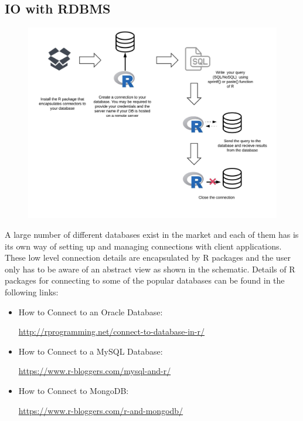 \subsection{IO with RDBMS}
\begin{figure}[ht]
 \centering
    \includegraphics[width = 15 cm]{./viz/ext/IO_R_RDBMS.jpeg}
\end{figure}
\begin{HIGHLIGHT}
A large number of different databases exist in the market and each of them has is its own way of setting up and managing connections with client applications. These low level connection details are encapsulated by R packages and the user only has to be aware of an abstract view as shown in the schematic. Details of R packages for connecting to some of the popular databases can be found in the following links:
\begin{itemize}
  \item How to Connect to an Oracle Database:
  
  \textcolor{cyan}{\url {http://rprogramming.net/connect-to-database-in-r/}}
  \item How to Connect to a MySQL Database:
  
  \textcolor{cyan}{\url {https://www.r-bloggers.com/mysql-and-r/}}
  \item How to Connect to MongoDB: 
  
  \textcolor{cyan}{\url {https://www.r-bloggers.com/r-and-mongodb/}}
\end{itemize}
\end{HIGHLIGHT}

